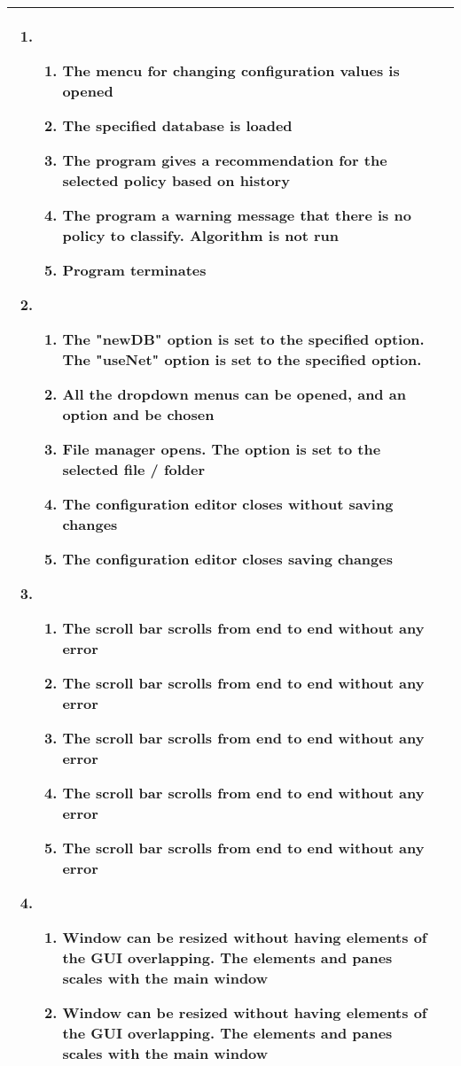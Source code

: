 \begin{center}
\begin{longtable}{ | p{4cm} | p{10cm} | }
\begin{enumerate}
							\item  
							\begin{enumerate}
								\item The mencu for changing configuration values is opened
								\item The specified database is loaded
								\item The program gives a recommendation for the selected policy based on history
								\item The program a warning message that there is no policy to classify. Algorithm is not run
								\item Program terminates
							\end{enumerate}
							
							\item
							\begin{enumerate}
								\item The "newDB" option is set to the specified option. The "useNet" option is set to the specified option.
								\item All the dropdown menus can be opened, and an option and be chosen
								\item File manager opens. The option is set to the selected file / folder
								\item The configuration editor closes without saving changes
								\item The configuration editor closes saving changes
							\end{enumerate}

							\item 
							\begin{enumerate}
								\item The scroll bar scrolls from end to end without any error
								\item The scroll bar scrolls from end to end without any error								
								\item The scroll bar scrolls from end to end without any error
								\item The scroll bar scrolls from end to end without any error						
								\item The scroll bar scrolls from end to end without any error
							\end{enumerate}

							\item 
							\begin{enumerate}
								\item Window can be resized without having elements of the GUI overlapping. The elements and panes scales with the main window
								\item Window can be resized without having elements of the GUI overlapping. The elements and panes scales with the main window
							\end{enumerate}
						\end{enumerate}
							 \\  [3pt] \hline


\end{longtable}
\end{center}
